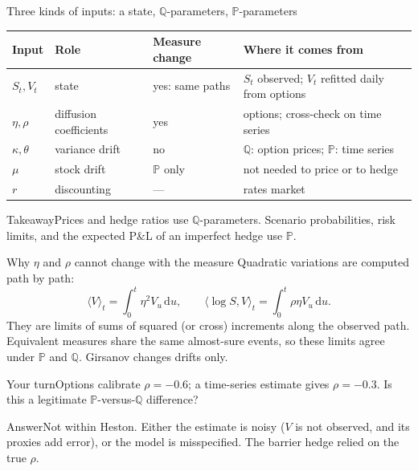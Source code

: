 \documentclass[handout,10pt,t,aspectratio=169]{beamer}
\newenvironment{pausebox}{\begin{block}{Your turn}}{\end{block}}
\newenvironment{answerbox}{\begin{exampleblock}{Answer}}{\end{exampleblock}}
\newenvironment{keybox}{\begin{exampleblock}{Takeaway}}{\end{exampleblock}}
\newcommand{\Q}{\mathbb Q}
\newcommand{\Pp}{\mathbb P}
\newcommand{\dd}{\,\mathrm d}
\begin{document}
\begin{frame}{Three kinds of inputs: a state, \(\Q\)-parameters, \(\Pp\)-parameters}
\small
\begin{center}
\begin{tabular}{@{}L{.12\textwidth}L{.19\textwidth}L{.20\textwidth}L{.39\textwidth}@{}}
\toprule Input & Role & Measure change & Where it comes from\\\midrule
\(S_t,V_t\) & state & yes: same paths & \(S_t\) observed; \(V_t\) refitted daily from options\\[.3em]
\(\eta,\rho\) & diffusion coefficients & yes & options; cross-check on time series\\[.3em]
\(\kappa,\theta\) & variance drift & no & \(\Q\): option prices; \(\Pp\): time series\\[.3em]
\(\mu\) & stock drift & \(\Pp\) only & not needed to price or to hedge\\[.3em]
\(r\) & discounting & --- & rates market\\\bottomrule
\end{tabular}
\end{center}
\begin{keybox}Prices and hedge ratios use \(\Q\)-parameters. Scenario probabilities,
risk limits, and the expected P\&L of an imperfect hedge use \(\Pp\).\end{keybox}
\end{frame}

\begin{frame}{Why \(\eta\) and \(\rho\) cannot change with the measure}
\small
Quadratic variations are computed path by path:
\[
\langle V\rangle_t=\int_0^t\eta^2V_u\dd u,\qquad
\langle\log S,V\rangle_t=\int_0^t\rho\eta V_u\dd u.
\]
They are limits of sums of squared (or cross) increments along the observed path.
Equivalent measures share the same almost-sure events, so these limits agree under
\(\Pp\) and \(\Q\). Girsanov changes drifts only.
\begin{pausebox}Options calibrate \(\rho=-0.6\); a time-series estimate gives \(\rho=-0.3\).
Is this a legitimate \(\Pp\)-versus-\(\Q\) difference?\end{pausebox}
\begin{answerbox}Not within Heston. Either the estimate is noisy (\(V\) is not observed,
and its proxies add error), or the model is misspecified. The barrier hedge relied on the true \(\rho\).\end{answerbox}
\end{frame}
\end{document}
